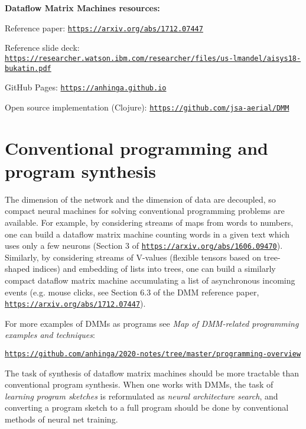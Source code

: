\documentclass{article}
\begin{document}
\vspace{0.1in}
\noindent
{\bf Dataflow Matrix Machines resources:}

Reference paper: \href{https://arxiv.org/abs/1712.07447}{\tt https://arxiv.org/abs/1712.07447}

Reference slide deck: \href{https://researcher.watson.ibm.com/researcher/files/us-lmandel/aisys18-bukatin.pdf}{\footnotesize\tt https://researcher.watson.ibm.com/researcher/files/us-lmandel/aisys18-bukatin.pdf}

GitHub Pages: \href{https://anhinga.github.io/}{\tt https://anhinga.github.io}

Open source implementation (Clojure): \href{https://github.com/jsa-aerial/DMM}{\tt https://github.com/jsa-aerial/DMM}

\section{Conventional programming and program synthesis} The dimension of the network and the dimension
of data are decoupled, so compact neural machines for solving conventional programming problems are available.
For example, by considering streams of maps from words to numbers, one can build a dataflow matrix machine
counting words in a given text which uses only a few neurons 
(Section 3 of \href{https://arxiv.org/abs/1606.09470}{\tt https://arxiv.org/abs/1606.09470}).
Similarly, by considering streams of V-values  (flexible tensors based on tree-shaped indices) and embedding
of lists into trees, one can build a similarly compact dataflow matrix machine
accumulating a list of asynchronous incoming events
(e.g. mouse clicks, see Section 6.3 of the DMM reference paper, \href{https://arxiv.org/abs/1712.07447}{\tt https://arxiv.org/abs/1712.07447}). 

For more examples of DMMs as programs see {\em Map of DMM-related programming examples and techniques}: 

\hspace{0.3in}\href{https://github.com/anhinga/2020-notes/tree/master/programming-overview}{\tt https://github.com/anhinga/2020-notes/tree/master/programming-overview}

\vspace{0.1in}

The task of synthesis of dataflow matrix machines
should be more tractable than conventional program synthesis. When one works with DMMs, the task of
{\em learning program sketches} is reformulated as {\em neural architecture search},
and converting a program sketch to a full program should be done by
conventional methods of neural net training. 
\end{document}
